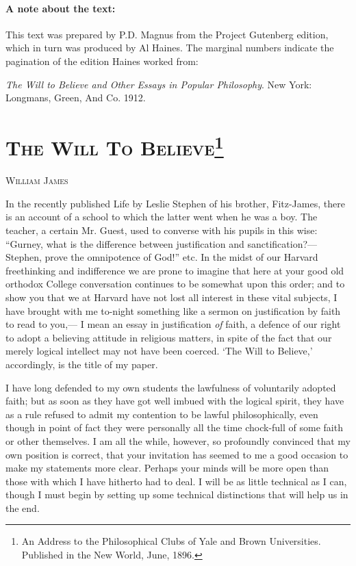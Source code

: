 \documentclass[12pt]{article}
\begin{document}
\setcounter{footnote}{0}

\paragraph{A note about the text:}This text was prepared by P.D. Magnus from the Project Gutenberg edition, which in turn was produced by Al Haines. The marginal numbers indicate the pagination of the edition Haines worked from:

\smallskip
\noindent\emph{The Will to Believe and Other Essays in Popular Philosophy}. New York: Longmans, Green, And Co. 1912.

\section*{\textsc{The Will To Believe}\footnote{An Address to the Philosophical Clubs of Yale and Brown Universities. Published in the New World, June, 1896.}}

{\textsc{William James}}

\medskip

In the recently published Life by Leslie Stephen of his brother, Fitz-James, there is an account of a school to which the latter went when he was a boy.  The teacher, a certain Mr. Guest, used to converse with his pupils in this wise: ``Gurney, what is the difference between justification and sanctification?--- Stephen, prove the omnipotence of God!'' etc.  In the midst of our Harvard freethinking and indifference we are prone to imagine that here at your good old orthodox College conversation continues to be somewhat upon this order; and to show you that we at Harvard have not lost all interest in these vital subjects, I have brought with me to-night something like a sermon on justification by faith to read to you,--- I mean an essay in justification \emph{of} faith, a defence of our right to adopt a believing attitude in religious matters, in spite of the fact that our merely logical  intellect may not have been coerced.  `The Will to Believe,' accordingly, is the title of my paper.

I have long defended to my own students the lawfulness of voluntarily adopted faith; but as soon as they have got well imbued with the logical spirit, they have as a rule refused to admit my contention to be lawful philosophically, even though in point of fact they were personally all the time chock-full of some faith or other themselves. I am all the while, however, so profoundly convinced that my own position is correct, that your invitation has seemed to me a good occasion to make my statements more clear.  Perhaps your minds will be more open than those with which I have hitherto had to deal.  I will be as little technical as I can, though I must begin by setting up some technical distinctions that will help us in the end.
\end{document}
